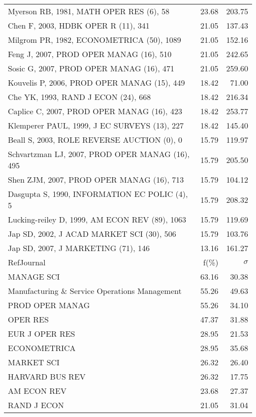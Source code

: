 \documentclass[a4paper,11pt]{report}
\begin{document}
\begin{landscape}
\begin{table}[!ht]
{\begin{tabular}{|l r r|}
Myerson RB, 1981, MATH OPER RES (6), 58 & 23.68 & 203.75\\
Chen F, 2003, HDBK OPER R (11), 341 & 21.05 & 137.43\\
Milgrom PR, 1982, ECONOMETRICA (50), 1089 & 21.05 & 152.16\\
Feng J, 2007, PROD OPER MANAG (16), 510 & 21.05 & 242.65\\
Sosic G, 2007, PROD OPER MANAG (16), 471 & 21.05 & 259.60\\
Kouvelis P, 2006, PROD OPER MANAG (15), 449 & 18.42 & 71.00\\
Che YK, 1993, RAND J ECON (24), 668 & 18.42 & 216.34\\
Caplice C, 2007, PROD OPER MANAG (16), 423 & 18.42 & 253.77\\
Klemperer PAUL, 1999, J EC SURVEYS (13), 227 & 18.42 & 145.40\\
Beall S, 2003, ROLE REVERSE AUCTION (0), 0 & 15.79 & 119.97\\
Schvartzman LJ, 2007, PROD OPER MANAG (16), 495 & 15.79 & 205.50\\
Shen ZJM, 2007, PROD OPER MANAG (16), 713 & 15.79 & 104.12\\
Dasgupta S, 1990, INFORMATION EC POLIC (4), 5 & 15.79 & 208.32\\
Lucking-reiley D, 1999, AM ECON REV (89), 1063 & 15.79 & 119.69\\
Jap SD, 2002, J ACAD MARKET SCI (30), 506 & 15.79 & 103.76\\
Jap SD, 2007, J MARKETING (71), 146 & 13.16 & 161.27\\
\hline
\hline
RefJournal & f(\%) & $\sigma$\\
\hline
MANAGE SCI & 63.16 & 30.38\\
Manufacturing \& Service Operations Management & 55.26 & 49.63\\
PROD OPER MANAG & 55.26 & 34.10\\
OPER RES & 47.37 & 31.88\\
EUR J OPER RES & 28.95 & 21.53\\
ECONOMETRICA & 28.95 & 35.68\\
MARKET SCI & 26.32 & 26.40\\
HARVARD BUS REV & 26.32 & 17.75\\
AM ECON REV & 23.68 & 27.37\\
RAND J ECON & 21.05 & 31.04\\
\hline
\end{tabular}
}
\end{table}


\end{landscape}
\end{document}
